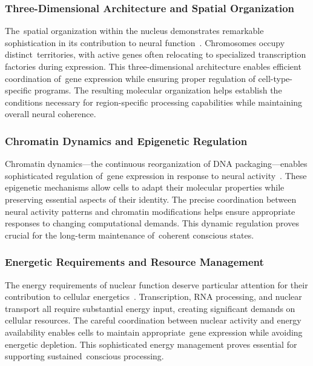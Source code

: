 \subsubsection{Three-Dimensional Architecture and Spatial Organization~~}

The~spatial organization within the nucleus demonstrates remarkable sophistication in its contribution to neural function~\cite{Dekker2013, Misteli2007}. Chromosomes occupy distinct~territories, with active genes often relocating to specialized transcription factories during expression. This three-dimensional architecture enables efficient coordination of~gene expression while ensuring proper regulation of cell-type-specific programs. The resulting molecular organization helps establish the conditions necessary for region-specific processing capabilities while maintaining overall neural coherence.

\subsubsection{Chromatin Dynamics and Epigenetic Regulation~~}

Chromatin dynamics—the continuous reorganization of DNA packaging—enables sophisticated regulation of~gene expression in response to neural activity~\cite{Maze2013, Yap2018}. These epigenetic mechanisms allow cells to adapt their molecular properties while preserving essential aspects of their identity. The precise coordination between neural activity patterns and chromatin modifications helps ensure appropriate responses to changing computational demands. This dynamic regulation proves crucial for the long-term maintenance of~coherent conscious states.

\subsubsection{Energetic Requirements and Resource Management~~}

The energy requirements of nuclear function deserve particular attention for their contribution to cellular energetics~\cite{Wright2016, Buszczak2014}. Transcription, RNA processing, and nuclear transport all require substantial energy input, creating significant demands on cellular resources. The careful coordination between nuclear activity and energy availability enables cells to maintain appropriate~gene expression while avoiding energetic depletion. This sophisticated energy management proves essential for supporting sustained~conscious processing.

